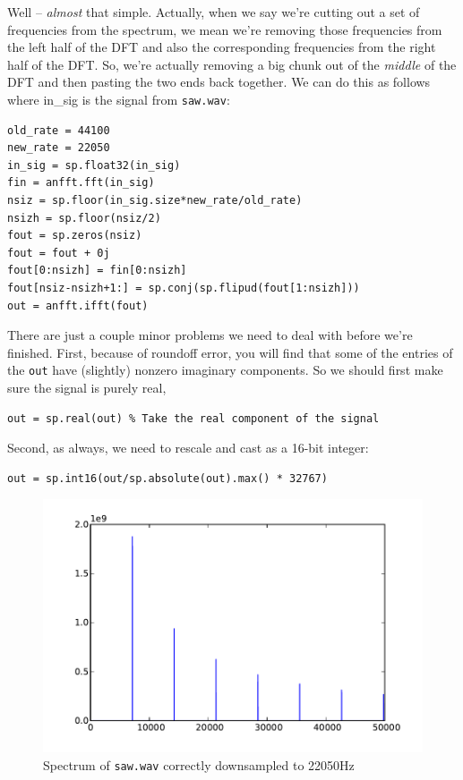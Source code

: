 Well -- \emph{almost} that simple. Actually, when we say we're cutting out a set of frequencies from the spectrum, we mean we're removing those frequencies from the left half of the DFT and also the corresponding frequencies from the right half of the DFT. So, we're actually removing a big chunk out of the \emph{middle} of the DFT and then pasting the two ends back together. We can do this as follows where in\_sig is the signal from \texttt{saw.wav}:
\begin{lstlisting}
old_rate = 44100
new_rate = 22050
in_sig = sp.float32(in_sig)
fin = anfft.fft(in_sig)
nsiz = sp.floor(in_sig.size*new_rate/old_rate)
nsizh = sp.floor(nsiz/2)
fout = sp.zeros(nsiz)
fout = fout + 0j
fout[0:nsizh] = fin[0:nsizh]
fout[nsiz-nsizh+1:] = sp.conj(sp.flipud(fout[1:nsizh]))
out = anfft.ifft(fout)
\end{lstlisting}
There are just a couple minor problems we need to deal with before we're finished. First, because of roundoff error, you will find that some of the entries of the \texttt{out} have (slightly) nonzero imaginary components.  So we should first make sure the signal is purely real,
\begin{lstlisting}
out = sp.real(out) % Take the real component of the signal
\end{lstlisting}
Second, as always, we need to rescale and cast as a 16-bit integer:
\begin{lstlisting}
out = sp.int16(out/sp.absolute(out).max() * 32767)
\end{lstlisting}


\begin{figure}[ht]\caption{Spectrum of \texttt{saw.wav} correctly downsampled to 22050Hz}\label{sawspecdown2}\centering\includegraphics[width=\textwidth]{sawdownspec}\end{figure}

